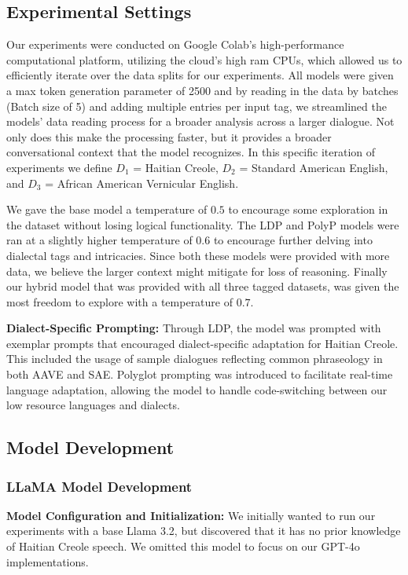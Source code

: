 \subsection{Experimental Settings}

Our experiments were conducted on Google Colab's high-performance computational platform, utilizing the cloud's high ram CPUs, which allowed us to efficiently iterate over the data splits for our experiments. All models were given a max token generation parameter of 2500 and by reading in the data by batches (Batch size of 5) and adding multiple entries per input tag, we streamlined the models' data reading process for a broader analysis across a larger dialogue. Not only does this make the processing faster, but it provides a broader conversational context that the model recognizes. In this specific iteration of experiments we define $D_1$ = Haitian Creole, $D_2$ = Standard American English, and $D_3$ = African American Vernicular English.

We gave the base model a temperature of $0.5$ to encourage some exploration in the dataset without losing logical functionality. The LDP and PolyP models were ran at a slightly higher temperature of $0.6$ to encourage further delving into dialectal tags and intricacies. Since both these models were provided with more data, we believe the larger context might mitigate for loss of reasoning. Finally our hybrid model that was provided with all three tagged datasets, was given the most freedom to explore with a temperature of $0.7$. 

\textbf{Dialect-Specific Prompting:} Through LDP, the model was prompted with exemplar prompts that encouraged dialect-specific adaptation for Haitian Creole. This included the usage of sample dialogues reflecting common phraseology in both AAVE and SAE. Polyglot prompting was introduced to facilitate real-time language adaptation, allowing the model to handle code-switching between our low resource languages and dialects.

\subsection{Model Development}

\subsubsection{LLaMA Model Development}

\textbf{Model Configuration and Initialization:} We initially wanted to run our experiments with a base Llama 3.2, but discovered that it has no prior knowledge of Haitian Creole speech. We omitted this model to focus on our GPT-4o implementations.

